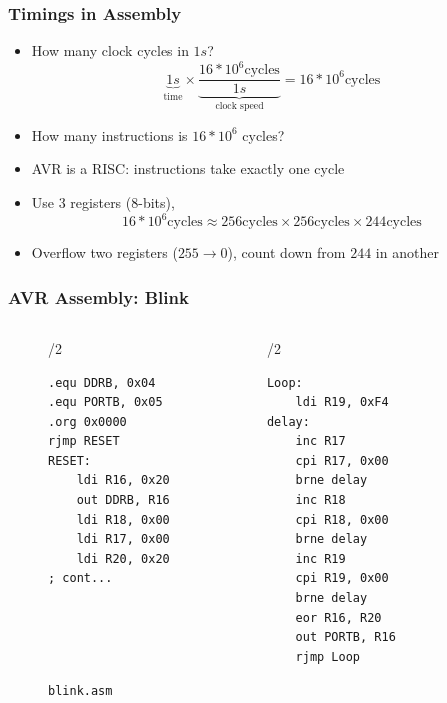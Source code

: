 \documentclass{beamer} \usetheme{Madrid}
\begin{document}
\begin{frame}
    \frametitle{Timings in Assembly}
    \begin{itemize}
        \item How many clock cycles in \(1\si{s}\)?
        \[
            \underbrace{1\si{s}}_{\text{time}}
            \times
            \underbrace{\frac{16*10^6 \text{cycles}}{1\si{s}}}_{\text{clock speed}}
            =
            16*10^6 \text{cycles}
        \]
        \item How many instructions is $16*10^6$ cycles?
        \item AVR is a RISC: instructions take exactly one cycle
        \item Use 3 registers (8-bits),
        \[
            16*10^6\text{cycles} \approx 256\text{cycles} \times 256\text{cycles} \times 244\text{cycles}
        \]
    \item Overflow two registers ($255 \rightarrow 0$), count down from $244$ in another
    \end{itemize}
\end{frame}

\begin{frame}[fragile]
    \frametitle{AVR Assembly: Blink}
    \begin{figure}
    \begin{columns}[t]
        \begin{column}{{\textwidth}/2}
            \begin{verbatim}
.equ DDRB, 0x04
.equ PORTB, 0x05
.org 0x0000
rjmp RESET
RESET:
    ldi R16, 0x20
    out DDRB, R16
    ldi R18, 0x00
    ldi R17, 0x00
    ldi R20, 0x20
; cont...
            \end{verbatim}
        \end{column}
        \begin{column}{{\textwidth}/2}
            \begin{verbatim}
Loop:
    ldi R19, 0xF4
delay:
    inc R17
    cpi R17, 0x00
    brne delay
    inc R18
    cpi R18, 0x00
    brne delay
    inc R19
    cpi R19, 0x00
    brne delay
    eor R16, R20
    out PORTB, R16
    rjmp Loop
            \end{verbatim}
        \end{column}
    \end{columns}
    \caption{\texttt{blink.asm}}
    \end{figure}
\end{frame}
\end{document}
